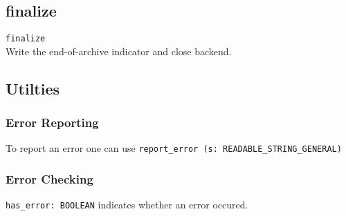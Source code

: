\subsection{finalize}
\lstinline;finalize;\\
Write the end-of-archive indicator and close backend.

\subsection{Utilties}
\subsubsection{Error Reporting}
To report an error one can use
\lstinline|report_error (s: READABLE_STRING_GENERAL)|

\subsubsection{Error Checking}
\lstinline|has_error: BOOLEAN| indicates whether an error occured.
